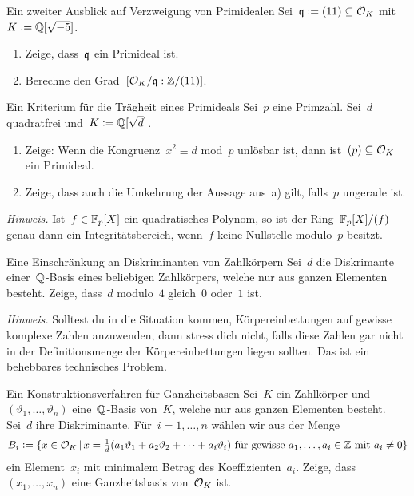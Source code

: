 \documentclass{uebblatt}
\begin{document}

\begin{aufgabe}{Ein zweiter Ausblick auf Verzweigung von Primidealen}
Sei~$\mathfrak{q} \vcentcolon= (11) \subseteq \mathcal{O}_K$ mit~$K \vcentcolon= \mathbb{Q}[\sqrt{-5}]$.
\begin{multicols}{2}
\begin{enumerate}
\item Zeige, dass~$\mathfrak{q}$ ein Primideal ist.
\item Berechne den Grad~$[\mathcal{O}_K/\mathfrak{q} : \mathbb{Z}/(11)]$.
\end{enumerate}
\end{multicols}
\vspace{-1em}
\end{aufgabe}

\begin{aufgabe}{Ein Kriterium für die Trägheit eines Primideals}
Sei~$p$ eine Primzahl. Sei~$d$ quadratfrei und~$K \vcentcolon= \mathbb{Q}[\sqrt{d}]$.
\begin{enumerate}
\item Zeige: Wenn die Kongruenz~$x^2 \equiv d$ mod~$p$ unlösbar ist,
dann ist~$(p) \subseteq \mathcal{O}_K$ ein Primideal.
\item Zeige, dass auch die Umkehrung der Aussage aus~a) gilt, falls~$p$
ungerade ist.
\end{enumerate}
{\tiny\emph{Hinweis.} Ist~$f \in \mathbb{F}_p[X]$ ein quadratisches Polynom, so ist
der Ring~$\mathbb{F}_p[X]/(f)$ genau dann ein Integritätsbereich, wenn~$f$ keine
Nullstelle modulo~$p$ besitzt.\par}
\end{aufgabe}

\begin{aufgabe}{Eine Einschränkung an Diskriminanten von Zahlkörpern}
Sei~$d$ die Diskrimante einer~$\mathbb{Q}$-Basis eines beliebigen Zahlkörpers, welche
nur aus ganzen Elementen besteht. Zeige, dass~$d$ modulo~$4$ gleich~$0$ oder~$1$ ist.

{\tiny\emph{Hinweis.} Solltest du in die Situation kommen, Körpereinbettungen
auf gewisse komplexe Zahlen anzuwenden, dann stress dich nicht, falls diese
Zahlen gar nicht in der Definitionsmenge der Körpereinbettungen liegen sollten.
Das ist ein behebbares technisches Problem.\par}
\end{aufgabe}

\begin{aufgabe}{Ein Konstruktionsverfahren für Ganzheitsbasen}
Sei~$K$ ein Zahlkörper und~$(\vartheta_1,\ldots,\vartheta_n)$ eine~$\mathbb{Q}$-Basis
von~$K$, welche nur aus ganzen Elementen besteht. Sei~$d$ ihre Diskriminante.
Für~$i = 1, \ldots, n$ wählen wir aus der Menge
\[ B_i \vcentcolon= \{ x \in \mathcal{O}_K \,|\,
  \text{$x = \tfrac{1}{d}(a_1\vartheta_1 + a_2\vartheta_2 + \cdots +
  a_i\vartheta_i)$ für gewisse~$a_1,\ldots,a_i \in \mathbb{Z}$ mit~$a_i
  \neq 0$} \} \]
ein Element~$x_i$ mit minimalem Betrag des Koeffizienten~$a_i$. Zeige,
dass~$(x_1,\ldots,x_n)$ eine Ganzheitsbasis von~$\mathcal{O}_K$ ist.
\end{aufgabe}
\end{document}
